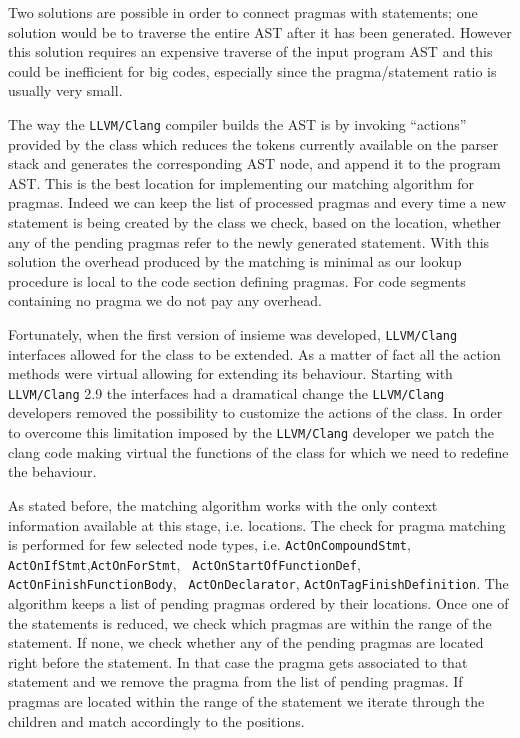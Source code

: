 Two solutions are possible in order to connect pragmas with statements; one
solution would be to traverse the entire AST after it has been generated.
However this solution requires an expensive traverse of the input program AST
and this could be inefficient for big codes, especially since the
pragma/statement ratio is usually very small. 

The way the {\tt LLVM/Clang} compiler builds the AST is by invoking ``actions''
provided by the  class which reduces the tokens currently
available on the parser stack and generates the corresponding AST node, and
append it to the program AST.
This is the best location for implementing our matching algorithm for pragmas.
Indeed we can keep the list of processed pragmas and every time a new
statement is being created by the  class we check, based on
the location, whether any of the pending pragmas refer to the newly generated
statement. With this solution the overhead produced by the matching is minimal
as our lookup procedure is local to the code section defining pragmas. For code
segments containing no pragma we do not pay any overhead. 

Fortunately, when the first version of insieme was developed, {\tt LLVM/Clang}
interfaces allowed for the class  to be extended. As a matter
of fact all the action methods were virtual allowing for extending its
behaviour.  Starting with {\tt LLVM/Clang} 2.9 the interfaces had a dramatical
change the {\tt LLVM/Clang} developers removed the possibility to customize the
actions of the  class. In order to overcome this limitation
imposed by the {\tt LLVM/Clang} developer we patch the clang code making virtual
the functions of the  class for which we need to redefine the
behaviour. 

As stated before, the matching algorithm works with the only context information
available at this stage, i.e. locations. The check for pragma matching is
performed for few selected node types, i.e. {\tt Act\-On\-Compound\-Stmt}, {\tt
Act\-On\-If\-Stmt},{\tt Act\-On\-For\-Stmt}, {\tt
Act\-On\-Start\-Of\-FunctionDef}, {\tt Act\-On\-Finish\-Function\-Body}, {\tt
Act\-On\-Declarator}, {\tt Act\-On\-Tag\-Finish\-Definition}.  The algorithm
keeps a list of pending pragmas ordered by their locations. Once one of the
statements is reduced, we check which pragmas are within the range of
the statement. If none, we check whether any of the pending pragmas are located
right before the statement. In that case the pragma gets associated to that
statement and we remove the pragma from the list of pending pragmas. If pragmas
are located within the range of the statement we iterate through the children
and match accordingly to the positions.

